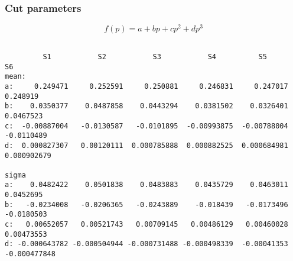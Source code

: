 \subsubsection{Cut parameters}\label{sec:ecp_parameters}
$$
f(p) = a + bp + cp^2 + dp^3
$$
\begin{verbatim}   

         S1           S2           S3           S4          S5            S6
mean:
a:     0.249471     0.252591     0.250881     0.246831     0.247017     0.248919
b:    0.0350377    0.0487858    0.0443294    0.0381502    0.0326401    0.0467523
c:  -0.00887004   -0.0130587   -0.0101895  -0.00993875  -0.00788004   -0.0110489
d:  0.000827307   0.00120111  0.000785888  0.000882525  0.000684981  0.000902679

sigma 
a:    0.0482422    0.0501838    0.0483883    0.0435729    0.0463011    0.0452695
b:   -0.0234008   -0.0206365   -0.0243889    -0.018439   -0.0173496   -0.0180503
c:   0.00652057   0.00521743   0.00709145   0.00486129   0.00460028   0.00473553
d: -0.000643782 -0.000504944 -0.000731488 -0.000498339  -0.00041353 -0.000477848
\end{verbatim}
